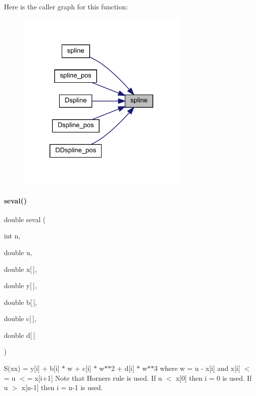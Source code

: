 Here is the caller graph for this function\+:
\nopagebreak
\begin{figure}[H]
\begin{center}
\leavevmode
\includegraphics[width=236pt]{namespaceamici_aa6801bbdb0c7625719c019ac287be29e_icgraph}
\end{center}
\end{figure}
\mbox{\label{namespaceamici_a20c8c27889853621fba3e0eacd333723}} 
\paragraph{\texorpdfstring{seval()}{seval()}}
{\footnotesize\ttfamily double seval (\begin{DoxyParamCaption}\item[{int}]{n,  }\item[{double}]{u,  }\item[{double}]{x\mbox{[}$\,$\mbox{]},  }\item[{double}]{y\mbox{[}$\,$\mbox{]},  }\item[{double}]{b\mbox{[}$\,$\mbox{]},  }\item[{double}]{c\mbox{[}$\,$\mbox{]},  }\item[{double}]{d\mbox{[}$\,$\mbox{]} }\end{DoxyParamCaption})}

S(xx) = y\mbox{[}i\mbox{]} + b\mbox{[}i\mbox{]} $\ast$ w + c\mbox{[}i\mbox{]} $\ast$ w$\ast$$\ast$2 + d\mbox{[}i\mbox{]} $\ast$ w$\ast$$\ast$3 where w = u -\/ x\mbox{[}i\mbox{]} and x\mbox{[}i\mbox{]} $<$= u $<$= x\mbox{[}i+1\mbox{]} Note that Horner\textquotesingle{}s rule is used. If u $<$ x\mbox{[}0\mbox{]} then i = 0 is used. If u $>$ x\mbox{[}n-\/1\mbox{]} then i = n-\/1 is used.


